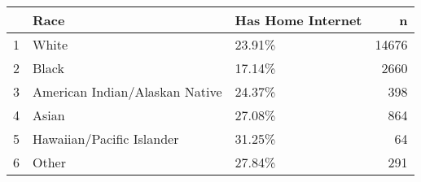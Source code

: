 \begin{table}[ht]
\centering
\begin{tabular}{rllr}
  \hline
 & Race & Has Home Internet & n \\ 
  \hline
1 & White & 23.91\% & 14676 \\ 
  2 & Black & 17.14\% & 2660 \\ 
  3 & American Indian/Alaskan Native & 24.37\% & 398 \\ 
  4 & Asian & 27.08\% & 864 \\ 
  5 & Hawaiian/Pacific Islander & 31.25\% &  64 \\ 
  6 & Other & 27.84\% & 291 \\ 
   \hline
\end{tabular}
\end{table}
